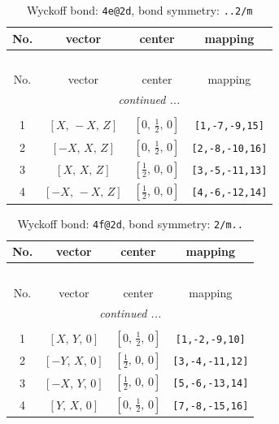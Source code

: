 \documentclass[fleqn,8pt]{jsarticle}
\begin{document}
\renewcommand{\arraystretch}{1.2}
\begin{longtable}{cccc}
\caption{Wyckoff bond: {\tt 4e@2d}, bond symmetry: {\tt ..2/m}}
 \\
 \hline \hline
No. & vector & center & mapping \\ \hline \endfirsthead

\multicolumn{3}{l}{\tablename\ \thetable{}} \\
 \hline \hline
No. & vector & center & mapping \\ \hline \endhead

 \hline \hline
\multicolumn{3}{r}{\footnotesize\it continued ...} \\ \endfoot

 \hline \hline
\multicolumn{3}{r}{} \\ \endlastfoot

1 & $\left[ X,\, - X,\, Z \right]$ & $\left[ 0,\, \frac{1}{2},\, 0 \right]$ & {\tt [1,-7,-9,15]} \\ \hline
2 & $\left[ - X,\, X,\, Z \right]$ & $\left[ 0,\, \frac{1}{2},\, 0 \right]$ & {\tt [2,-8,-10,16]} \\ \hline
3 & $\left[ X,\, X,\, Z \right]$ & $\left[ \frac{1}{2},\, 0,\, 0 \right]$ & {\tt [3,-5,-11,13]} \\ \hline
4 & $\left[ - X,\, - X,\, Z \right]$ & $\left[ \frac{1}{2},\, 0,\, 0 \right]$ & {\tt [4,-6,-12,14]} \\
\end{longtable}
\renewcommand{\arraystretch}{1.2}
\begin{longtable}{cccc}
\caption{Wyckoff bond: {\tt 4f@2d}, bond symmetry: {\tt 2/m..}}
 \\
 \hline \hline
No. & vector & center & mapping \\ \hline \endfirsthead

\multicolumn{3}{l}{\tablename\ \thetable{}} \\
 \hline \hline
No. & vector & center & mapping \\ \hline \endhead

 \hline \hline
\multicolumn{3}{r}{\footnotesize\it continued ...} \\ \endfoot

 \hline \hline
\multicolumn{3}{r}{} \\ \endlastfoot

1 & $\left[ X,\, Y,\, 0 \right]$ & $\left[ 0,\, \frac{1}{2},\, 0 \right]$ & {\tt [1,-2,-9,10]} \\ \hline
2 & $\left[ - Y,\, X,\, 0 \right]$ & $\left[ \frac{1}{2},\, 0,\, 0 \right]$ & {\tt [3,-4,-11,12]} \\ \hline
3 & $\left[ - X,\, Y,\, 0 \right]$ & $\left[ \frac{1}{2},\, 0,\, 0 \right]$ & {\tt [5,-6,-13,14]} \\ \hline
4 & $\left[ Y,\, X,\, 0 \right]$ & $\left[ 0,\, \frac{1}{2},\, 0 \right]$ & {\tt [7,-8,-15,16]} \\
\end{longtable}
\end{document}
